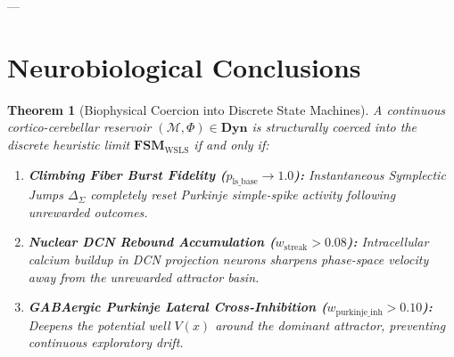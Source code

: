 \documentclass[11pt,twoside,a4paper]{article}
\newtheorem{theorem}{Theorem}
\begin{document}
---

\section{Neurobiological Conclusions}

\begin{theorem}[Biophysical Coercion into Discrete State Machines]
A continuous cortico-cerebellar reservoir $(\mathcal{M}, \Phi) \in \mathbf{Dyn}$ is structurally coerced into the discrete heuristic limit $\mathbf{FSM}_{\text{WSLS}}$ if and only if:
\begin{enumerate}
    \item \textbf{Climbing Fiber Burst Fidelity ($p_{\text{ls\_base}} \to 1.0$):} Instantaneous Symplectic Jumps $\Delta_\Sigma$ completely reset Purkinje simple-spike activity following unrewarded outcomes.
    \item \textbf{Nuclear DCN Rebound Accumulation ($w_{\text{streak}} > 0.08$):} Intracellular calcium buildup in DCN projection neurons sharpens phase-space velocity away from the unrewarded attractor basin.
    \item \textbf{GABAergic Purkinje Lateral Cross-Inhibition ($w_{\text{purkinje\_inh}} > 0.10$):} Deepens the potential well $V(x)$ around the dominant attractor, preventing continuous exploratory drift.
\end{enumerate}
\end{theorem}
\end{document}
